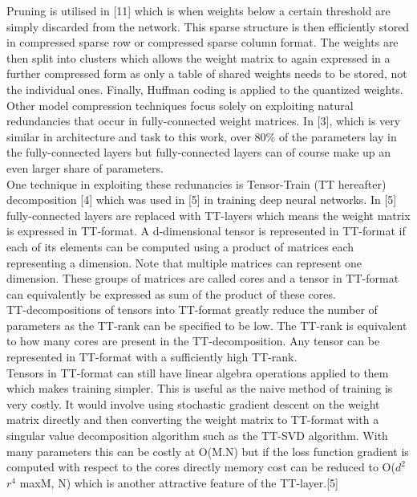 \documentclass{article}
\begin{document}
Pruning is utilised in [11] which is when weights below a certain threshold are simply discarded from the network. This sparse structure is then efficiently stored in compressed sparse row or compressed sparse column format. The weights are then split into clusters which allows the weight matrix to again expressed in a further compressed form as only a table of shared weights needs to be stored, not the individual ones. Finally, Huffman coding is applied to the quantized weights.\\

Other model compression techniques focus solely on exploiting natural redundancies that occur in fully-connected weight matrices. In [3], which is very similar in architecture and task to this work, over 80\% of the parameters lay in the fully-connected layers but fully-connected layers can of course make up an even larger share of parameters.\\

One technique in exploiting these redunancies is Tensor-Train (TT hereafter) decomposition [4] which was used in [5] in training deep neural networks. In [5] fully-connected layers are replaced with TT-layers which means the weight matrix is expressed in TT-format. A d-dimensional tensor is represented in TT-format if each of its elements can be computed using a product of matrices each representing a dimension. Note that multiple matrices can represent one dimension. These groups of matrices are called cores and a tensor in TT-format can equivalently be expressed as sum of the product of these cores. \\

TT-decompositions of tensors into TT-format greatly reduce the number of parameters as the TT-rank can be specified to be low. The TT-rank is equivalent to how many cores are present in the TT-decomposition. Any tensor can be represented in TT-format with a sufficiently high TT-rank.\\

Tensors in TT-format can still have linear algebra operations applied to them which makes training simpler. This is useful as the naive method of training is very costly. It would involve using stochastic gradient descent on the weight matrix directly and then converting the weight matrix to TT-format with a singular value decomposition algorithm such as the TT-SVD algorithm. With many parameters this can be costly at O(M.N) but if the loss function gradient is computed with respect to the cores directly memory cost can be reduced to O($d^2$ $r^4$ max{M, N}) which is another attractive feature of the TT-layer.[5]\\
\end{document}
